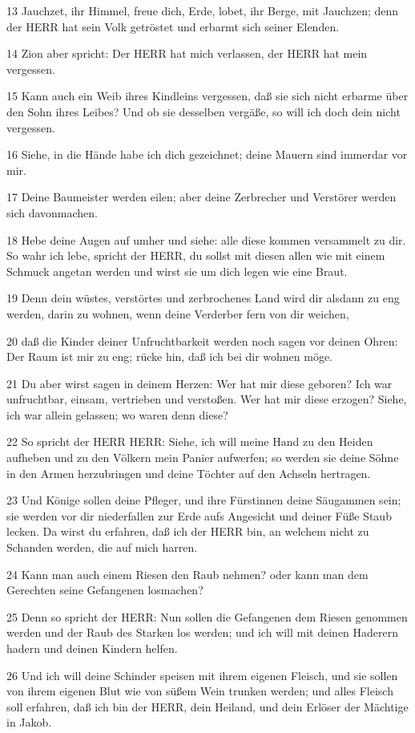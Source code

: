 \par 13 Jauchzet, ihr Himmel, freue dich, Erde, lobet, ihr Berge, mit Jauchzen; denn der HERR hat sein Volk getröstet und erbarmt sich seiner Elenden.
\par 14 Zion aber spricht: Der HERR hat mich verlassen, der HERR hat mein vergessen.
\par 15 Kann auch ein Weib ihres Kindleins vergessen, daß sie sich nicht erbarme über den Sohn ihres Leibes? Und ob sie desselben vergäße, so will ich doch dein nicht vergessen.
\par 16 Siehe, in die Hände habe ich dich gezeichnet; deine Mauern sind immerdar vor mir.
\par 17 Deine Baumeister werden eilen; aber deine Zerbrecher und Verstörer werden sich davonmachen.
\par 18 Hebe deine Augen auf umher und siehe: alle diese kommen versammelt zu dir. So wahr ich lebe, spricht der HERR, du sollst mit diesen allen wie mit einem Schmuck angetan werden und wirst sie um dich legen wie eine Braut.
\par 19 Denn dein wüstes, verstörtes und zerbrochenes Land wird dir alsdann zu eng werden, darin zu wohnen, wenn deine Verderber fern von dir weichen,
\par 20 daß die Kinder deiner Unfruchtbarkeit werden noch sagen vor deinen Ohren: Der Raum ist mir zu eng; rücke hin, daß ich bei dir wohnen möge.
\par 21 Du aber wirst sagen in deinem Herzen: Wer hat mir diese geboren? Ich war unfruchtbar, einsam, vertrieben und verstoßen. Wer hat mir diese erzogen? Siehe, ich war allein gelassen; wo waren denn diese?
\par 22 So spricht der HERR HERR: Siehe, ich will meine Hand zu den Heiden aufheben und zu den Völkern mein Panier aufwerfen; so werden sie deine Söhne in den Armen herzubringen und deine Töchter auf den Achseln hertragen.
\par 23 Und Könige sollen deine Pfleger, und ihre Fürstinnen deine Säugammen sein; sie werden vor dir niederfallen zur Erde aufs Angesicht und deiner Füße Staub lecken. Da wirst du erfahren, daß ich der HERR bin, an welchem nicht zu Schanden werden, die auf mich harren.
\par 24 Kann man auch einem Riesen den Raub nehmen? oder kann man dem Gerechten seine Gefangenen losmachen?
\par 25 Denn so spricht der HERR: Nun sollen die Gefangenen dem Riesen genommen werden und der Raub des Starken los werden; und ich will mit deinen Haderern hadern und deinen Kindern helfen.
\par 26 Und ich will deine Schinder speisen mit ihrem eigenen Fleisch, und sie sollen von ihrem eigenen Blut wie von süßem Wein trunken werden; und alles Fleisch soll erfahren, daß ich bin der HERR, dein Heiland, und dein Erlöser der Mächtige in Jakob.

